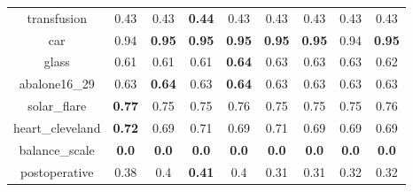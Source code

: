 \documentclass{article}%
\begin{document}
\begin{tabular}{c|cccccccc}
transfusion&0.43&0.43&\textbf{0.44}&0.43&0.43&0.43&0.43&0.43\\%

car&0.94&\textbf{0.95}&\textbf{0.95}&\textbf{0.95}&\textbf{0.95}&\textbf{0.95}&0.94&\textbf{0.95}\\%

glass&0.61&0.61&0.61&\textbf{0.64}&0.63&0.63&0.63&0.62\\%

abalone16\_29&0.63&\textbf{0.64}&0.63&\textbf{0.64}&0.63&0.63&0.63&0.63\\%

solar\_flare&\textbf{0.77}&0.75&0.75&0.76&0.75&0.75&0.75&0.76\\%

heart\_cleveland&\textbf{0.72}&0.69&0.71&0.69&0.71&0.69&0.69&0.69\\%

balance\_scale&\textbf{0.0}&\textbf{0.0}&\textbf{0.0}&\textbf{0.0}&\textbf{0.0}&\textbf{0.0}&\textbf{0.0}&\textbf{0.0}\\%

postoperative&0.38&0.4&\textbf{0.41}&0.4&0.31&0.31&0.32&0.32\\%

\end{tabular}

%
\end{document}
